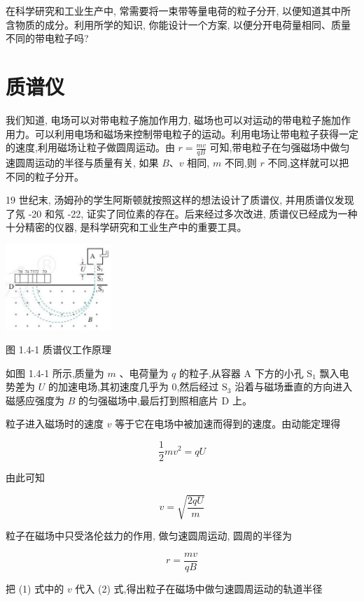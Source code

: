 \documentclass[10pt]{article}
\begin{document}
在科学研究和工业生产中, 常需要将一束带等量电荷的粒子分开, 以便知道其中所含物质的成分。利用所学的知识, 你能设计一个方案, 以便分开电荷量相同、质量不同的带电粒子吗?

\section*{质谱仪}

我们知道, 电场可以对带电粒子施加作用力, 磁场也可以对运动的带电粒子施加作用力。可以利用电场和磁场来控制带电粒子的运动。利用电场让带电粒子获得一定的速度,利用磁场让粒子做圆周运动。由 \(r = \frac{mv}{qB}\) 可知,带电粒子在匀强磁场中做匀速圆周运动的半径与质量有关, 如果 \(B\text{、}v\) 相同, \(m\) 不同,则 \(r\) 不同,这样就可以把不同的粒子分开。

19 世纪末, 汤姆孙的学生阿斯顿就按照这样的想法设计了质谱仪, 并用质谱仪发现了氖 -20 和氖 -22, 证实了同位素的存在。后来经过多次改进, 质谱仪已经成为一种十分精密的仪器, 是科学研究和工业生产中的重要工具。

\begin{center}
\includegraphics[max width=0.3\textwidth]{images/01910e72-c5b7-7ed5-a6d4-fb3a5faefc32_22_634528.jpg}
\end{center}

图 1.4-1 质谱仪工作原理

如图 1.4-1 所示,质量为 \(m\) 、电荷量为 \(q\) 的粒子,从容器 \(\mathrm{A}\) 下方的小孔 \({\mathrm{S}}_{1}\) 飘入电势差为 \(U\) 的加速电场,其初速度几乎为 0,然后经过 \({\mathrm{S}}_{3}\) 沿着与磁场垂直的方向进入磁感应强度为 \(B\) 的匀强磁场中,最后打到照相底片 \(\mathrm{D}\) 上。

粒子进入磁场时的速度 \(v\) 等于它在电场中被加速而得到的速度。由动能定理得

\[
\frac{1}{2}m{v}^{2} = {qU}
\]

由此可知

\[
v = \sqrt{\frac{2qU}{m}} \tag{1}
\]

粒子在磁场中只受洛伦兹力的作用, 做匀速圆周运动, 圆周的半径为

\[
r = \frac{mv}{qB} \tag{（2）}
\]

把 (1) 式中的 \(v\) 代入 (2) 式,得出粒子在磁场中做匀速圆周运动的轨道半径
\end{document}
